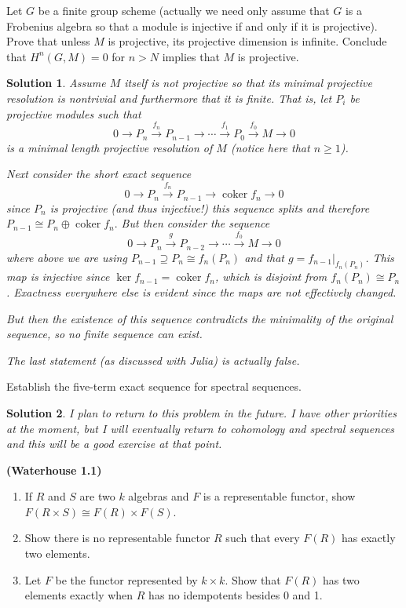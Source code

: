 \documentclass[12pt]{article}
\theoremstyle{nonumberbreak}
\newtheorem{sol}{Solution}
\theoremstyle{changebreak}
\theoremstyle{nonumberplain}
\theoremstyle{change}
\newenvironment{wprob}[1]{\begin{prob}{\normalfont\bfseries (Waterhouse #1) }\itshape}{\end{prob}}
\DeclareMathOperator{\coker}{coker}
\begin{document}
\begin{prob}
	Let $G$ be a finite group scheme (actually we need only assume that $G$ is a Frobenius algebra so that a module
	is injective if and only if it is projective). Prove that unless $M$ is projective, its projective dimension is 
	infinite. Conclude that $H^n(G,M)=0$ for $n>N$ implies that $M$ is projective.
\end{prob}
\begin{sol}
	Assume $M$ itself is not projective so that its minimal projective resolution is nontrivial and furthermore
	that it is finite. That is, let $P_i$ be projective modules such that
	\[0\to P_n\xrightarrow{f_n} P_{n-1}\to\cdots \xrightarrow{f_{1}}P_0\xrightarrow{f_0} M\to 0\]
	is a minimal length projective resolution of $M$ (notice here that $n\ge 1$). 
	
	Next consider the short exact sequence
	\[0\to P_n\xrightarrow{f_n}P_{n-1}\to \coker f_n\to 0\]
	since $P_n$ is projective (and thus injective!) this sequence splits and therefore $P_{n-1}\cong P_n\oplus\coker f_n.$
	But then consider the sequence
	\[0\to P_n\xrightarrow{g} P_{n-2}\to\cdots\xrightarrow{f_0}M\to 0\]
	where above we are using $P_{n-1}\supseteq P_n\cong f_n(P_n)$  and that
	$g=f_{n-1}|_{f_n(P_n)}$. This map is injective since $\ker f_{n-1}=\coker f_n$, which is disjoint
	from $f_n(P_n)\cong P_n$. Exactness everywhere else is evident since the maps are not effectively changed.

	But then the existence of this sequence contradicts the minimality of the original sequence, so
	no finite sequence can exist.

	The last statement (as discussed with Julia) is actually false. 
\end{sol}

\begin{prob}
	Establish the five-term exact sequence for spectral sequences.
\end{prob}
\begin{sol}
	I plan to return to this problem in the future. I have other priorities at the moment,
	but I will eventually return to cohomology and spectral sequences and this will be a good
	exercise at that point.
\end{sol}

\begin{wprob}{1.1}
	\begin{enumerate}
		\item If $R$ and $S$ are two $k$ algebras and $F$ is a representable functor, show $F(R\times S)\cong F(R)\times F(S)$.
		\item Show there is no representable functor $R$ such that every $F(R)$ has exactly two elements.
		\item Let $F$ be the functor represented by $k\times k$. Show that $F(R)$ has two elements exactly when $R$ has no idempotents besides 0 and 1.
	\end{enumerate}
\end{wprob}
\end{document}
